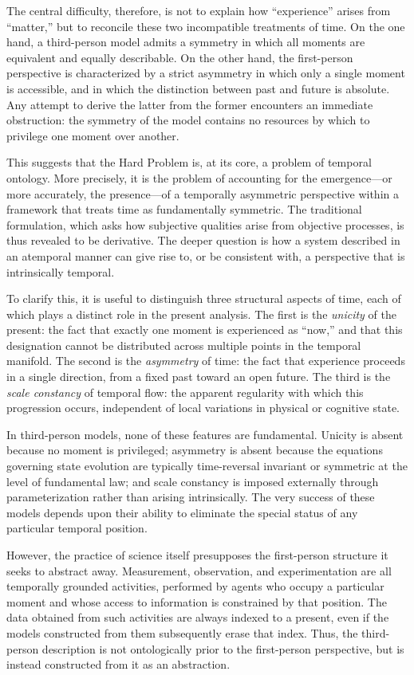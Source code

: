 \documentclass[11pt,a4paper]{article}
\theoremstyle{definition}
\theoremstyle{remark}
\begin{document}
The central difficulty, therefore, is not to explain how ``experience'' arises from ``matter,'' but to reconcile these two incompatible treatments of time. On the one hand, a third-person model admits a symmetry in which all moments are equivalent and equally describable. On the other hand, the first-person perspective is characterized by a strict asymmetry in which only a single moment is accessible, and in which the distinction between past and future is absolute. Any attempt to derive the latter from the former encounters an immediate obstruction: the symmetry of the model contains no resources by which to privilege one moment over another.

This suggests that the Hard Problem is, at its core, a problem of temporal ontology. More precisely, it is the problem of accounting for the emergence---or more accurately, the presence---of a temporally asymmetric perspective within a framework that treats time as fundamentally symmetric. The traditional formulation, which asks how subjective qualities arise from objective processes, is thus revealed to be derivative. The deeper question is how a system described in an atemporal manner can give rise to, or be consistent with, a perspective that is intrinsically temporal.

To clarify this, it is useful to distinguish three structural aspects of time, each of which plays a distinct role in the present analysis. The first is the \emph{unicity} of the present: the fact that exactly one moment is experienced as ``now,'' and that this designation cannot be distributed across multiple points in the temporal manifold. The second is the \emph{asymmetry} of time: the fact that experience proceeds in a single direction, from a fixed past toward an open future. The third is the \emph{scale constancy} of temporal flow: the apparent regularity with which this progression occurs, independent of local variations in physical or cognitive state.

In third-person models, none of these features are fundamental. Unicity is absent because no moment is privileged; asymmetry is absent because the equations governing state evolution are typically time-reversal invariant or symmetric at the level of fundamental law; and scale constancy is imposed externally through parameterization rather than arising intrinsically. The very success of these models depends upon their ability to eliminate the special status of any particular temporal position.

However, the practice of science itself presupposes the first-person structure it seeks to abstract away. Measurement, observation, and experimentation are all temporally grounded activities, performed by agents who occupy a particular moment and whose access to information is constrained by that position. The data obtained from such activities are always indexed to a present, even if the models constructed from them subsequently erase that index. Thus, the third-person description is not ontologically prior to the first-person perspective, but is instead constructed from it as an abstraction.
\end{document}
